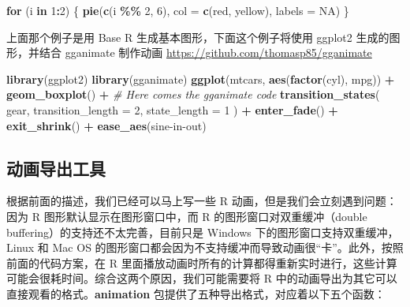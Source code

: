 \documentclass[
  b5paper,
  UTF8,twoside]{book}
\newenvironment{Shaded}{\begin{snugshade}}{\end{snugshade}}
\newcommand{\AttributeTok}[1]{\textcolor[rgb]{0.13,0.29,0.53}{#1}}
\newcommand{\CommentTok}[1]{\textcolor[rgb]{0.56,0.35,0.01}{\textit{#1}}}
\newcommand{\ConstantTok}[1]{\textcolor[rgb]{0.56,0.35,0.01}{#1}}
\newcommand{\ControlFlowTok}[1]{\textcolor[rgb]{0.13,0.29,0.53}{\textbf{#1}}}
\newcommand{\DecValTok}[1]{\textcolor[rgb]{0.00,0.00,0.81}{#1}}
\newcommand{\FunctionTok}[1]{\textcolor[rgb]{0.13,0.29,0.53}{\textbf{#1}}}
\newcommand{\NormalTok}[1]{#1}
\newcommand{\SpecialCharTok}[1]{\textcolor[rgb]{0.81,0.36,0.00}{\textbf{#1}}}
\newcommand{\StringTok}[1]{\textcolor[rgb]{0.31,0.60,0.02}{#1}}
\begin{document}
\begin{Shaded}
\begin{Highlighting}[]
\ControlFlowTok{for}\NormalTok{ (i }\ControlFlowTok{in} \DecValTok{1}\SpecialCharTok{:}\DecValTok{2}\NormalTok{) \{}
  \FunctionTok{pie}\NormalTok{(}\FunctionTok{c}\NormalTok{(i }\SpecialCharTok{\%\%} \DecValTok{2}\NormalTok{, }\DecValTok{6}\NormalTok{), }\AttributeTok{col =} \FunctionTok{c}\NormalTok{(}\StringTok{\textquotesingle{}red\textquotesingle{}}\NormalTok{, }\StringTok{\textquotesingle{}yellow\textquotesingle{}}\NormalTok{), }\AttributeTok{labels =} \ConstantTok{NA}\NormalTok{)}
\NormalTok{\}}
\end{Highlighting}
\end{Shaded}

\begin{center}\end{center}

上面那个例子是用 Base R 生成基本图形，下面这个例子将使用 ggplot2 生成的图形，并结合 gganimate 制作动画 \url{https://github.com/thomasp85/gganimate}

\begin{Shaded}
\begin{Highlighting}[]
\FunctionTok{library}\NormalTok{(ggplot2)}
\FunctionTok{library}\NormalTok{(gganimate)}
\FunctionTok{ggplot}\NormalTok{(mtcars, }\FunctionTok{aes}\NormalTok{(}\FunctionTok{factor}\NormalTok{(cyl), mpg)) }\SpecialCharTok{+} 
  \FunctionTok{geom\_boxplot}\NormalTok{() }\SpecialCharTok{+} 
  \CommentTok{\# Here comes the gganimate code}
  \FunctionTok{transition\_states}\NormalTok{(}
\NormalTok{    gear,}
    \AttributeTok{transition\_length =} \DecValTok{2}\NormalTok{,}
    \AttributeTok{state\_length =} \DecValTok{1}
\NormalTok{  ) }\SpecialCharTok{+}
  \FunctionTok{enter\_fade}\NormalTok{() }\SpecialCharTok{+} 
  \FunctionTok{exit\_shrink}\NormalTok{() }\SpecialCharTok{+}
  \FunctionTok{ease\_aes}\NormalTok{(}\StringTok{\textquotesingle{}sine{-}in{-}out\textquotesingle{}}\NormalTok{)}
\end{Highlighting}
\end{Shaded}

\subsection{动画导出工具}\label{ux52a8ux753bux5bfcux51faux5de5ux5177}

根据前面的描述，我们已经可以马上写一些 R 动画，但是我们会立刻遇到问题：因为 R 图形默认显示在图形窗口中，而 R 的图形窗口对双重缓冲（double buffering）的支持还不太完善，目前只是 Windows 下的图形窗口支持双重缓冲，Linux 和 Mac OS 的图形窗口都会因为不支持缓冲而导致动画很``卡''。此外，按照前面的代码方案，在 R 里面播放动画时所有的计算都得重新实时进行，这些计算可能会很耗时间。综合这两个原因，我们可能需要将 R 中的动画导出为其它可以直接观看的格式。\textbf{animation} 包提供了五种导出格式，对应着以下五个函数：
\end{document}
